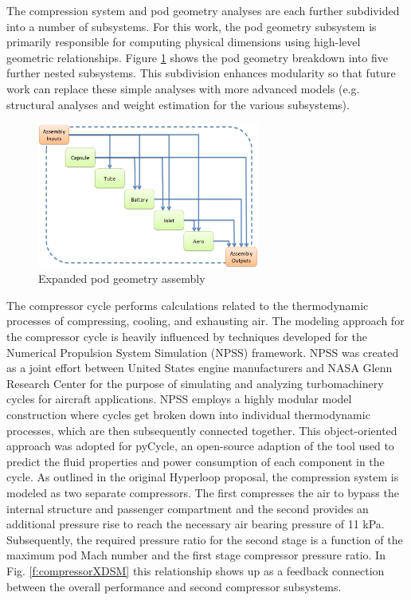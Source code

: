 \documentclass[heading.tex]{subfiles}
\begin{document}
The compression system and pod geometry analyses are each further subdivided into a number of subsystems. For this work, the pod geometry 
subsystem is primarily responsible for computing physical dimensions using high-level geometric relationships.
 Figure \ref{f:podXDSM} shows the pod geometry breakdown into five further nested subsystems.
This subdivision enhances modularity so that future work can replace these simple analyses with more advanced models
(e.g. structural analyses and weight estimation for the various subsystems).

\begin{figure}[hbtp]
\centering
\includegraphics[width=0.65\textwidth]{images/podAssembly.png}
\caption{Expanded pod geometry assembly}
\label{f:podXDSM}
\end{figure}

The compressor cycle performs calculations related to the thermodynamic processes of compressing, cooling, and exhausting air. 
The modeling approach for the compressor cycle is heavily influenced by
techniques developed for the Numerical Propulsion System Simulation (NPSS) framework. 
NPSS was created as a joint effort between United States engine manufacturers and NASA Glenn Research Center for the purpose of 
simulating and analyzing turbomachinery cycles for aircraft applications\cite{Lytle}. NPSS employs a highly modular model construction
where cycles get broken down into individual thermodynamic processes, which are then subsequently connected together. 
This object-oriented approach was adopted for pyCycle,
an open-source adaption of the tool used to predict the fluid properties and power consumption of each component in the cycle. 
As outlined in the original Hyperloop proposal, the compression system is modeled as two separate compressors.
The first compresses the air to bypass the internal structure and passenger compartment
and the second provides an additional pressure rise to reach the necessary air bearing pressure of 11 kPa. 
Subsequently, the required pressure ratio for the second stage is a function of the maximum pod Mach number
and the first stage compressor pressure ratio.
In Fig. \ref{f:compressorXDSM} this relationship shows up as a feedback connection between
the overall performance and second compressor subsystems. 
\end{document}
